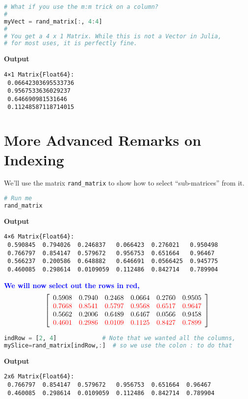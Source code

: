\begin{lstlisting}[language=Julia,style=mystyle]
# What if you use the m:m trick on a column?
#
myVect = rand_matrix[:, 4:4]
#
# You get a 4 x 1 Matrix. While this is not a Vector in Julia, 
# for most uses, it is perfectly fine.
\end{lstlisting}
\textbf{Output} 
\begin{verbatim}
4×1 Matrix{Float64}:
 0.06642303695533736
 0.9567533636029237
 0.646690981531646
 0.11248587118714015
\end{verbatim}

\section{More Advanced Remarks on Indexing}

We'll use the matrix \texttt{rand\_matrix} to show how to select ``sub-matrices'' from it.

\begin{lstlisting}[language=Julia,style=mystyle]
# Run me
rand_matrix
\end{lstlisting}
\textbf{Output} 
\begin{verbatim}
4×6 Matrix{Float64}:
 0.590845  0.794026  0.246837   0.066423  0.276021   0.950498
 0.766797  0.854147  0.579672   0.956753  0.651664   0.96467
 0.566237  0.200586  0.648882   0.646691  0.0566425  0.945775
 0.460085  0.298614  0.0109059  0.112486  0.842714   0.789904
\end{verbatim}

\vspace*{.2cm}

\textcolor{blue}{\bf We will now select out the rows in red,}
\begin{equation}
\left[
\begin{array}{cccccc}
0.5908 & 0.7940 & 0.2468 & 0.0664 & 0.2760 & 0.9505 \\
\color{red} 0.7668 & \color{red} 0.8541 &  \color{red} 0.5797 & \color{red} 0.9568 & \color{red} 0.6517 & \color{red} 0.9647 \\
0.5662 & 0.2006 &  0.6489 &  0.6467 & 0.0566 & 0.9458 \\
\color{red} 0.4601 & \color{red} 0.2986 & \color{red} 0.0109 & \color{red} 0.1125 & \color{red} 0.8427 & \color{red} 0.7899 \\
\end{array}
\right]
\end{equation}



\begin{lstlisting}[language=Julia,style=mystyle]
indRow = [2, 4]             # Note that we wanted all the columns, 
mySlice=rand_matrix[indRow,:]  # so we use the colon : to do that
\end{lstlisting}
\textbf{Output} 
\begin{verbatim}
2x6 Matrix{Float64}:
 0.766797  0.854147  0.579672   0.956753  0.651664  0.96467
 0.460085  0.298614  0.0109059  0.112486  0.842714  0.789904
\end{verbatim}

